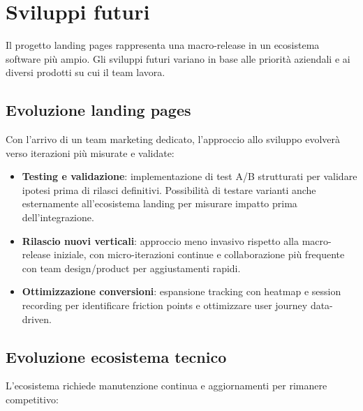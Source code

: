 \section{Sviluppi futuri}

Il progetto landing pages rappresenta una macro-release in un ecosistema software 
più ampio. Gli sviluppi futuri variano in base alle priorità aziendali e ai diversi 
prodotti su cui il team lavora.

\subsection{Evoluzione landing pages}

Con l'arrivo di un team marketing dedicato, l'approccio allo sviluppo evolverà 
verso iterazioni più misurate e validate:

\begin{itemize}
  \item \textbf{Testing e validazione}: implementazione di test A/B strutturati 
        per validare ipotesi prima di rilasci definitivi. Possibilità di testare 
        varianti anche esternamente all'ecosistema landing per misurare impatto 
        prima dell'integrazione.
  
  \item \textbf{Rilascio nuovi verticali}: approccio meno invasivo rispetto alla 
        macro-release iniziale, con micro-iterazioni continue e collaborazione 
        più frequente con team design/product per aggiustamenti rapidi.
  
  \item \textbf{Ottimizzazione conversioni}: espansione tracking con heatmap e 
        session recording per identificare friction points e ottimizzare user 
        journey data-driven.
\end{itemize}

\subsection{Evoluzione ecosistema tecnico}

L'ecosistema richiede manutenzione continua e aggiornamenti per rimanere 
competitivo:

